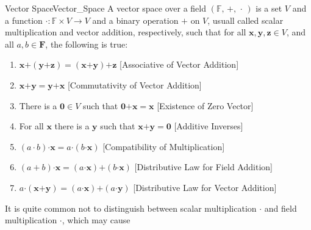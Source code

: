     \begin{fdefinition}{Vector Space}{Vector_Space}
        A vector space over a field $(\mathbb{F},\,+,\,\cdot\,)$ is a
        set $V$ and a function
        $\boldsymbol{\cdot}:\mathbb{F}\times{V}\rightarrow{V}$ and
        a binary operation $\boldsymbol{+}$ on $V$, usuall called
        scalar multiplication and vector addition, respectively, 
        such that for all $\mathbf{x},\mathbf{y},\mathbf{z}\in{V}$,
        and all $a,b\in\mathbf{F}$, the following is true:
        \begin{enumerate}
            \item $\mathbf{x}\boldsymbol{+}%
                   (\mathbf{y}\boldsymbol{+}\mathbf{z})=%
                   (\mathbf{x}\boldsymbol{+}\mathbf{y})%
                   \boldsymbol{+}\mathbf{z}$
                  \hfill[Associative of Vector Addition]
            \item $\mathbf{x}\boldsymbol{+}\mathbf{y}=%
                   \mathbf{y}\boldsymbol{+}\mathbf{x}$
                  \hfill[Commutativity of Vector Addition]
            \item There is a $\mathbf{0}\in{V}$ such that
                  $\mathbf{0}\boldsymbol{+}\mathbf{x}=\mathbf{x}$
                  \hfill[Existence of Zero Vector]
            \item For all $\mathbf{x}$ there is a $\mathbf{y}$ such that
                  $\mathbf{x}\boldsymbol{+}\mathbf{y}=\mathbf{0}$
                  \hfill[Additive Inverses]
            \item $(a\cdot{b})\boldsymbol{\cdot}\mathbf{x}=%
                    a\boldsymbol{\cdot}(b\boldsymbol{\cdot}\mathbf{x})$
                  \hfill[Compatibility of Multiplication]
            \item $(a+b)\boldsymbol{\cdot}\mathbf{x}=%
                   (a\boldsymbol{\cdot}\mathbf{x})\boldsymbol{+}%
                   (b\boldsymbol{\cdot}\mathbf{x})$
                  \hfill[Distributive Law for Field Addition]
            \item $a\boldsymbol{\cdot}(\mathbf{x}\boldsymbol{+}\mathbf{y})=%
                   (a\boldsymbol{\cdot}\mathbf{x})\boldsymbol{+}%
                   (a\boldsymbol{\cdot}\mathbf{y})$
                  \hfill[Distributive Law for Vector Addition]
        \end{enumerate}
    \end{fdefinition}
    It is quite common not to distinguish between scalar multiplication
    $\boldsymbol{\cdot}$ and field multiplication $\cdot$, which may cause
